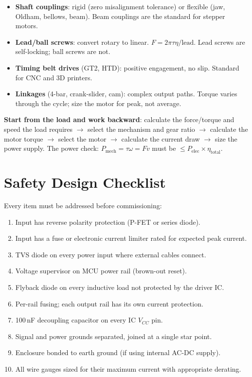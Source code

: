 \begin{itemize}[leftmargin=1.5em]
  \item \textbf{Shaft couplings}: rigid (zero misalignment tolerance) or flexible (jaw, Oldham, bellows, beam). Beam couplings are the standard for stepper motors.
  \item \textbf{Lead/ball screws}: convert rotary to linear. $F = 2\pi \tau \eta / \text{lead}$. Lead screws are self-locking; ball screws are not.
  \item \textbf{Timing belt drives} (GT2, HTD): positive engagement, no slip. Standard for CNC and 3D printers.
  \item \textbf{Linkages} (4-bar, crank-slider, cam): complex output paths. Torque varies through the cycle; size the motor for peak, not average.
\end{itemize}

\begin{keyconceptbox}
\textbf{Start from the load and work backward}: calculate the force/torque and speed the load requires $\to$ select the mechanism and gear ratio $\to$ calculate the motor torque $\to$ select the motor $\to$ calculate the current draw $\to$ size the power supply. The power check: $P_{\text{mech}} = \tau \omega = F v$ must be $\leq P_{\text{elec}} \times \eta_{\text{total}}$.
\end{keyconceptbox}


\section{Safety Design Checklist}
\label{sec:checklist}

Every item must be addressed before commissioning:

\begin{enumerate}[leftmargin=1.5em]
  \item Input has reverse polarity protection (P-FET or series diode).
  \item Input has a fuse or electronic current limiter rated for expected peak current.
  \item TVS diode on every power input where external cables connect.
  \item Voltage supervisor on MCU power rail (brown-out reset).
  \item Flyback diode on every inductive load not protected by the driver IC.
  \item Per-rail fusing; each output rail has its own current protection.
  \item 100\,nF decoupling capacitor on every IC $V_{CC}$ pin.
  \item Signal and power grounds separated, joined at a single star point.
  \item Enclosure bonded to earth ground (if using internal AC-DC supply).
  \item All wire gauges sized for their maximum current with appropriate derating.
\end{enumerate}

